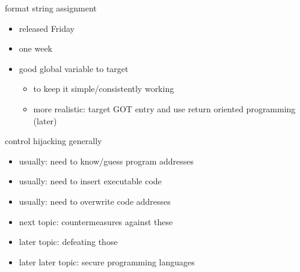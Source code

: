 \begin{frame}{format string assignment}
    \begin{itemize}
        \item released Friday
        \item one week
        \item good global variable to target
            \begin{itemize}
                \item to keep it simple/consistently working
                \item more realistic: target GOT entry and use return oriented programming (later)
            \end{itemize}
    \end{itemize}
\end{frame}









\begin{frame}{control hijacking generally}
    \begin{itemize}
    \item usually: need to know/guess program addresses
    \item usually: need to insert executable code
    \item usually: need to overwrite code addresses
    \vspace{.5cm}
    \item next topic: countermeasures against these
    \item later topic: defeating those
    \item later later topic: secure programming languages
    \end{itemize}
\end{frame}

